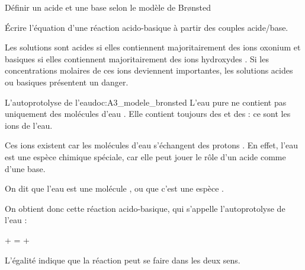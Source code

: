\tetePremStssChim

\vspace*{-30pt}

\begin{objectifs}
  \item Définir un acide et une base selon le modèle de Br\o{}nsted
  \item Écrire l'équation d'une réaction acido-basique à partir des couples acide/base.
\end{objectifs}

\begin{contexte}
  Les solutions sont acides si elles contiennent majoritairement des ions oxonium \oxonium
  et basiques si elles contiennent majoritairement des ions hydroxydes \hydroxyde.
  Si les concentrations molaires de ces ions deviennent importantes, les solutions acides ou basiques présentent un danger.

\end{contexte}

\begin{doc}{L'autoprotolyse de l'eau}{doc:A3_modele_bronsted}
  L'eau pure ne contient pas uniquement des molécules d'eau .
  Elle contient toujours des  \oxonium et des  \hydroxyde : ce sont les ions de l'eau.

  Ces ions existent car les molécules d'eau  s'échangent des protons .
  En effet, l'eau est une espèce chimique spéciale, car elle peut jouer le rôle d'un acide comme d'une base.
  \begin{importants}  
    On dit que l'eau est une molécule , ou que c'est une espèce .
  \end{importants}

  On obtient donc cette réaction acido-basique, qui s’appelle l’autoprotolyse de l’eau : 
  \begin{center}
     +  = \oxonium + \hydroxyde
  \end{center}
  \attention L'égalité indique que la réaction peut se faire dans les deux sens.
\end{doc}




